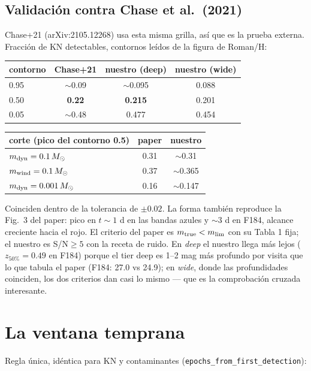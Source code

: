 \documentclass[11pt,a4paper]{article}
\newcommand{\code}[1]{\texttt{\small #1}}
\newcommand{\Msun}{M_\odot}
\begin{document}
\subsection{Validación contra Chase et al.\ (2021)}
Chase+21 (arXiv:2105.12268) usa esta misma grilla, así que es la prueba externa. Fracción de KN
detectables, contornos leídos de la figura de Roman/H:

\begin{center}
\begin{tabular}{lccc}
\toprule
contorno & Chase+21 & nuestro (deep) & nuestro (wide) \\
\midrule
0.95 & $\sim$0.09 & $\sim$0.095 & 0.088 \\
0.50 & \textbf{0.22} & \textbf{0.215} & 0.201 \\
0.05 & $\sim$0.48 & 0.477 & 0.454 \\
\bottomrule
\end{tabular}
\qquad
\begin{tabular}{lcc}
\toprule
corte (pico del contorno 0.5) & paper & nuestro \\
\midrule
$m_{\rm dyn}=0.1\,\Msun$   & 0.31 & $\sim$0.31 \\
$m_{\rm wind}=0.1\,\Msun$  & 0.37 & $\sim$0.365 \\
$m_{\rm dyn}=0.001\,\Msun$ & 0.16 & $\sim$0.147 \\
\bottomrule
\end{tabular}
\end{center}

Coinciden dentro de la tolerancia de $\pm0.02$. La forma también reproduce la Fig.\ 3 del paper:
pico en $t\sim1$ d en las bandas azules y $\sim3$ d en F184, alcance creciente hacia el rojo.
El criterio del paper es $m_{\rm true} < m_{\rm lim}$ con su Tabla 1 fija; el nuestro es S/N$\ge5$
con la receta de ruido. En \emph{deep} el nuestro llega más lejos ($z_{50\%}=0.49$ en F184) porque
el tier deep es 1--2 mag más profundo por visita que lo que tabula el paper (F184: 27.0 vs 24.9);
en \emph{wide}, donde las profundidades coinciden, los dos criterios dan casi lo mismo --- que es
la comprobación cruzada interesante.

\section{La ventana temprana}

Regla única, idéntica para KN y contaminantes (\code{epochs\_from\_first\_detection}):
\end{document}

